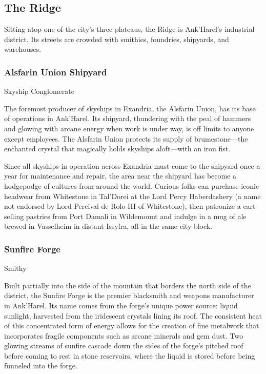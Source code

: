 \documentclass[10pt,a4paper,twoside,bg=print,twocolumn,openany,nodeprecatedcode]{dndbook}
\begin{document}
\subsection{The Ridge}
Sitting atop one of the city's three plateaus, the Ridge is Ank'Harel's industrial district. Its streets are crowded with smithies, foundries, shipyards, and warehouses.

\subsubsection{Alsfarin Union Shipyard}
Skyship Conglomerate

The foremost producer of skyships in Exandria, the Alsfarin Union, has its base of operations in Ank'Harel. Its shipyard, thundering with the peal of hammers and glowing with arcane energy when work is under way, is off limits to anyone except employees. The Alsfarin Union protects its supply of brumestone—the enchanted crystal that magically holds skyships aloft—with an iron fist.

Since all skyships in operation across Exandria must come to the shipyard once a year for maintenance and repair, the area near the shipyard has become a hodgepodge of cultures from around the world. Curious folks can purchase iconic headwear from Whitestone in Tal'Dorei at the Lord Percy Haberdashery (a name not endorsed by Lord Percival de Rolo III of Whitestone), then patronize a cart selling pastries from Port Damali in Wildemount and indulge in a mug of ale brewed in Vasselheim in distant Issylra, all in the same city block.

\subsubsection{Sunfire Forge}
Smithy

Built partially into the side of the mountain that borders the north side of the district, the Sunfire Forge is the premier blacksmith and weapons manufacturer in Ank'Harel. Its name comes from the forge's unique power source: liquid sunlight, harvested from the iridescent crystals lining its roof. The consistent heat of this concentrated form of energy allows for the creation of fine metalwork that incorporates fragile components such as arcane minerals and gem dust. Two glowing streams of sunfire cascade down the sides of the forge's pitched roof before coming to rest in stone reservoirs, where the liquid is stored before being funneled into the forge.
\end{document}
